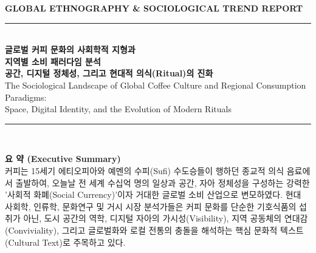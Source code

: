 \documentclass[10pt,a4paper]{article}
\begin{document}
\begin{titlepage}
    \centering
    \vspace*{1.2cm}
    
    {\Large\scshape\textcolor{AmberGold}{\textbf{GLOBAL ETHNOGRAPHY \& SOCIOLOGICAL TREND REPORT}}}\\[0.7cm]
    
    \rule{\textwidth}{1.5pt}\\[0.4cm]
    {\LARGE\bfseries\color{CoffeeBrown} 글로벌 커피 문화의 사회학적 지형과\\지역별 소비 패러다임 분석}\\[0.3cm]
    {\Large\bfseries\color{DeepOlive} 공간, 디지털 정체성, 그리고 현대적 의식(Ritual)의 진화}\\[0.3cm]
    {\large\color{SlateGray} The Sociological Landscape of Global Coffee Culture and Regional Consumption Paradigms:\\Space, Digital Identity, and the Evolution of Modern Rituals}\\[0.4cm]
    \rule{\textwidth}{0.8pt}\\[1.2cm]
    
    \begin{tcolorbox}[colback=white,colframe=CoffeeBrown,width=0.94\textwidth]
    \textbf{\large 요 약 (Executive Summary)}\\[0.3cm]
    \small
    커피는 15세기 에티오피아와 예멘의 수피(Sufi) 수도승들이 행하던 종교적 의식 음료에서 출발하여, 오늘날 전 세계 수십억 명의 일상과 공간, 자아 정체성을 구성하는 강력한 '사회적 화폐(Social Currency)'이자 거대한 글로벌 소비 산업으로 변모하였다. 현대 사회학, 인류학, 문화연구 및 거시 시장 분석가들은 커피 문화를 단순한 기호식품의 섭취가 아닌, 도시 공간의 역학, 디지털 자아의 가시성(Visibility), 지역 공동체의 연대감(Conviviality), 그리고 글로벌화와 로컬 전통의 충돌을 해석하는 핵심 문화적 텍스트(Cultural Text)로 주목하고 있다.
    

\end{tcolorbox}
\end{titlepage}
\end{document}
